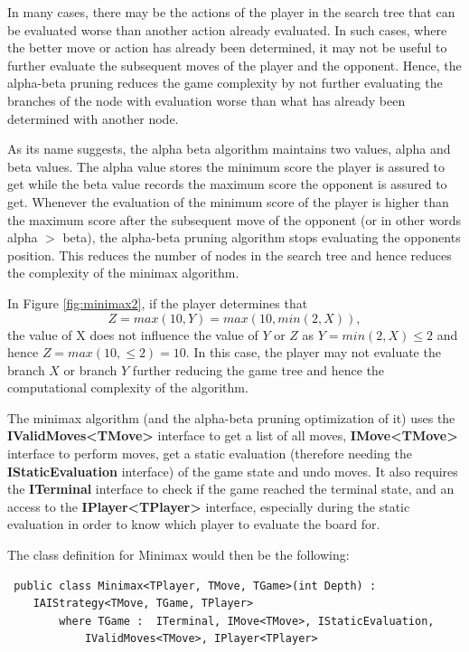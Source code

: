In many cases, there may be the actions of the player in the search tree that can be evaluated worse than another action already evaluated. In such cases, where the better move or action has already been determined, it may not be useful to further evaluate the subsequent moves of the player and the opponent. Hence, the alpha-beta pruning reduces the game complexity by not further evaluating the branches of the node with evaluation worse than what has already been determined with another node.

As its name suggests, the alpha beta algorithm maintains two values, alpha and beta values. The alpha value stores the minimum score the player is assured to get while the beta value records the maximum score the opponent is assured to get. Whenever the evaluation of the minimum score of the player is higher than the maximum score after the subsequent move of the opponent (or in other words alpha $>$ beta), the alpha-beta pruning algorithm stops evaluating the opponents position. This reduces the number of nodes in the search tree and hence reduces the complexity of the minimax algorithm.

In Figure \ref{fig:minimax2}, if the player determines that 
\begin{equation}
    Z = max (10, Y) = max (10,  min (2, X)),
\end{equation}
the value of X does not influence the value of $Y$ or $Z$ as $Y = min(2, X) \leq 2$ and hence $Z = max(10, \leq 2) = 10$. In this case, the player may not evaluate the branch $X$ or branch $Y$ further reducing the game tree and hence the computational complexity of the algorithm. 


The minimax algorithm (and the alpha-beta pruning optimization of it)  uses the \textbf{IValidMoves\textless{}TMove\textgreater{}} interface to get a list of all moves, \textbf{IMove\textless{}TMove\textgreater{}} interface to perform moves, get a static evaluation (therefore needing the \textbf{IStaticEvaluation} interface) of the game state and undo moves. It also requires the \textbf{ITerminal} interface to check if the game reached the terminal state, and an access to the \textbf{IPlayer\textless{}TPlayer\textgreater{}} interface, especially during the static evaluation in order to know which player to evaluate the board for.

The class definition for Minimax would then be the following:

\begin{lstlisting}
 public class Minimax<TPlayer, TMove, TGame>(int Depth) :
    IAIStrategy<TMove, TGame, TPlayer>
        where TGame :  ITerminal, IMove<TMove>, IStaticEvaluation,
            IValidMoves<TMove>, IPlayer<TPlayer>
\end{lstlisting}

